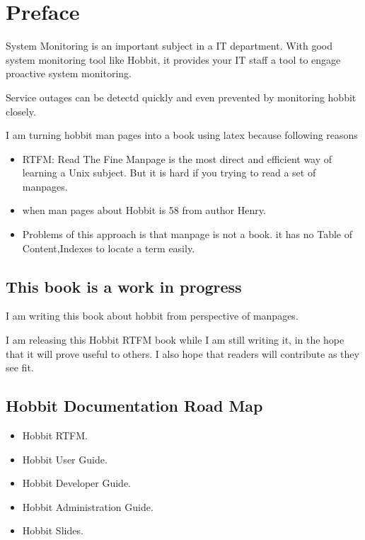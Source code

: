 \chapter{Preface}
\label{chap:preface}

System Monitoring is an important subject in a IT department.
With good system monitoring tool like Hobbit, it provides your IT
staff a tool to engage proactive system monitoring.

Service outages can be detectd quickly and even prevented by monitoring
hobbit closely.

I am turning hobbit man pages into a book using latex because following reasons

\begin{itemize}
\item RTFM: Read The Fine Manpage is the most direct and efficient way of
learning a Unix subject. But it is hard if you trying to read a set of manpages.
\item  when man pages about Hobbit is 58 from author Henry.
\item Problems of this approach is that manpage is not a book. it has no
Table of Content,Indexes to locate a term easily.

\end{itemize}

\section{This book is a work in progress}

I am writing this  book about hobbit from perspective of manpages.  

I am releasing this Hobbit RTFM book while I am still writing it, in the hope that
it will prove useful to others.  I also hope that readers will contribute as they see fit.

\section{Hobbit Documentation Road Map}


\begin{itemize}
\item Hobbit RTFM.
\item Hobbit User Guide.
\item Hobbit Developer Guide.
\item Hobbit Administration Guide.
\item Hobbit Slides.

\end{itemize}

